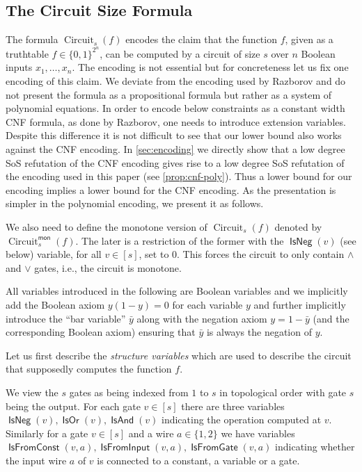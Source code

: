 \documentclass[10pt,a4paper]{article}
\theoremstyle{plain}
\theoremstyle{remark}
\theoremstyle{definition}
\newcommand{\set}[1]{\{#1\}}
\newcommand{\vars}[1]{\mathsf{#1}}
\DeclareMathOperator{\circuit}{Circuit}
\DeclareMathOperator{\isneg}{\vars{IsNeg}}
\DeclareMathOperator{\isand}{\vars{IsAnd}}
\DeclareMathOperator{\isor}{\vars{IsOr}}
\DeclareMathOperator{\isfromconst}{\vars{IsFromConst}}
\DeclareMathOperator{\isfromvar}{\vars{IsFromInput}}
\DeclareMathOperator{\isfromgate}{\vars{IsFromGate}}
\begin{document}
\subsection{The Circuit Size Formula}
\label{sec:circuit-encoding}
The formula $\circuit_s(f)$ encodes the claim that the function $f$,
given as a truthtable $f \in \set{0, 1}^{2^n}$, can be computed by a
circuit of size $s$ over $n$ Boolean inputs $x_1, \ldots, x_n$. The
encoding is not essential but for concreteness let us fix one encoding
of this claim. We deviate from the encoding used by Razborov
\cite{Razborov98, Razborov04ResolutionLowerBoundsPM} and do not
present the formula as a propositional formula but rather as a system
of polynomial equations. In order to encode below constraints as a
constant width CNF formula, as done by Razborov, one needs to
introduce extension variables. Despite this difference it is not
difficult to see that our lower bound also works against the CNF
encoding. In \cref{sec:encoding} we directly show that a low degree
SoS refutation of the CNF encoding gives rise to a low degree SoS
refutation of the encoding used in this paper (see
\cref{prop:cnf-poly}). Thus a lower bound for our encoding implies a
lower bound for the CNF encoding. As the presentation is simpler in
the polynomial encoding, we present it as follows.

We also need to define the monotone version of $\circuit_s(f)$ denoted
by $\circuit^{\mathsf{mon}}_s(f)$. The later is a restriction of the
former with the $\isneg(v)$ (see below) variable, for all $v \in [s]$,
set to $0$. This forces the circuit to only contain $\land$ and $\lor$
gates, i.e., the circuit is monotone.

All variables introduced in the following are Boolean variables and we
implicitly add the Boolean axiom $y(1 - y) = 0$ for each variable $y$
and further implicitly introduce the ``bar variable'' $\bar{y}$ along
with the negation axiom $y = 1 - \bar{y}$ (and the corresponding
Boolean axiom) ensuring that $\bar{y}$ is always the negation of $y$.

Let us first describe the \emph{structure variables} which are used to
describe the circuit that supposedly computes the function $f$.

We view the $s$ gates as being indexed from $1$ to $s$ in topological
order with gate $s$ being the output.
For each gate $v \in [s]$ there are three variables $\isneg(v),
\isor(v), \isand(v)$ indicating the operation computed at
$v$. Similarly for a gate $v \in [s]$ and a wire $a \in \set{1,2}$ we
have variables $\isfromconst(v, a), \isfromvar(v, a), \isfromgate(v, a)$
indicating whether the input wire $a$ of $v$ is connected to a
constant, a variable or a gate.
\end{document}

